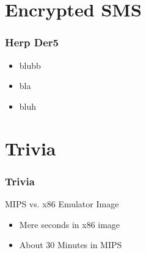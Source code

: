 \documentclass{beamer}
\begin{document}
\section{Encrypted SMS}
	\begin{frame}
		\tableofcontents[currentsection]
	\end{frame}
	\begin{frame}
	\frametitle{Herp Der5}
		\begin{itemize}
			\item blubb
			\item bla
			\item bluh
		\end{itemize}
	\end{frame}
	
\section{Trivia}
	\begin{frame}
		\tableofcontents[currentsection]
	\end{frame}
	\begin{frame}
	\frametitle{Trivia}
		MIPS vs. x86 Emulator Image
		\begin{itemize}
			\item Mere seconds in x86 image%
			\item About 30 Minutes in MIPS
		\end{itemize}
	\end{frame}
\end{document}
